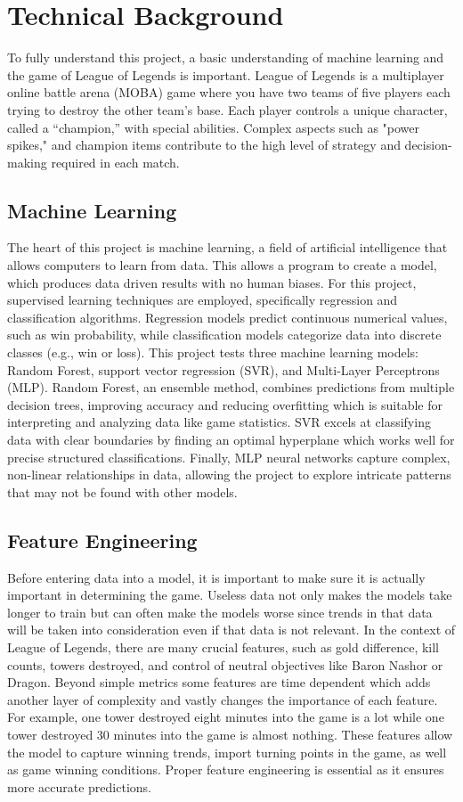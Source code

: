 \documentclass[10pt,twocolumn]{article}
\begin{document}
\section{Technical Background}

To fully understand this project, a basic understanding of machine learning and the game of League of Legends is important.
League of Legends is a multiplayer online battle arena (MOBA) game where you have two teams of five players each trying to destroy the other team's base. Each player controls a unique character, called a “champion,” with special abilities. Complex aspects such as "power spikes," and champion items contribute to the high level of strategy and decision-making required in each match.
\subsection{Machine Learning}
The heart of this project is machine learning, a field of artificial intelligence that allows computers to learn from data. This allows a program to create a model, which produces data driven results with no human biases. For this project, supervised learning techniques are employed, specifically regression and classification algorithms. Regression models predict continuous numerical values, such as win probability, while classification models categorize data into discrete classes (e.g., win or loss). This project tests three machine learning models: Random Forest, support vector regression (SVR), and Multi-Layer Perceptrons (MLP). Random Forest, an ensemble method, combines predictions from multiple decision trees, improving accuracy and reducing overfitting which is suitable for interpreting and analyzing data like game statistics. SVR excels at classifying data with clear boundaries by finding an optimal hyperplane which works well for precise structured classifications. Finally, MLP neural networks capture complex, non-linear relationships in data, allowing the project to explore intricate patterns that may not be found with other models.

\subsection{Feature Engineering}
Before entering data into a model, it is important to make sure it is actually important in determining the game\cite{dong2018feature}. Useless data not only makes the models take longer to train but can often make the models worse since trends in that data will be taken into consideration even if that data is not relevant. In the context of League of Legends, there are many crucial features, such as gold difference, kill counts, towers destroyed, and control of neutral objectives like Baron Nashor or Dragon. Beyond simple metrics some features are time dependent which adds another layer of complexity and vastly changes the importance of each feature. For example, one tower destroyed eight minutes into the game is a lot while one tower destroyed 30 minutes into the game is almost nothing. These features allow the model to capture winning trends, import turning points in the game, as well as game winning conditions. Proper feature engineering is essential as it ensures more accurate predictions.
\end{document}

